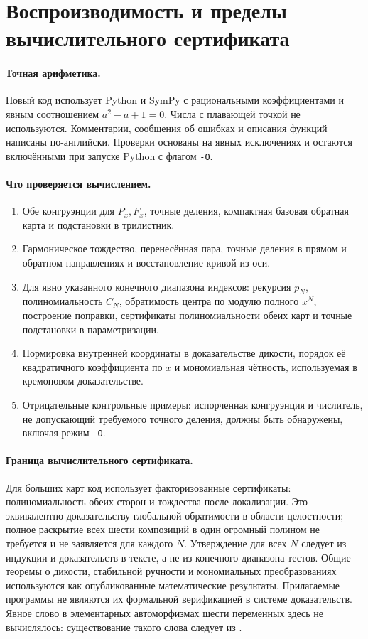 \section{Воспроизводимость и пределы вычислительного сертификата}
\label{sec:reproducibility}

\paragraph{Точная арифметика.}
Новый код использует Python и SymPy с рациональными коэффициентами
и явным соотношением $a^2-a+1=0$. Числа с плавающей точкой не
используются. Комментарии, сообщения об ошибках и описания функций
написаны по-английски. Проверки основаны на явных исключениях и
остаются включёнными при запуске Python с флагом \texttt{-O}.

\paragraph{Что проверяется вычислением.}
\begin{enumerate}
\item Обе конгруэнции для $P_x,F_x$, точные деления, компактная
базовая обратная карта и подстановки в трилистник.
\item Гармоническое тождество, перенесённая пара, точные деления
в прямом и обратном направлениях и восстановление кривой из оси.
\item Для явно указанного конечного диапазона индексов:
рекурсия $p_N$, полиномиальность $C_N$, обратимость центра по модулю
полного $x^N$, построение поправки, сертификаты полиномиальности
обеих карт и точные подстановки в параметризации.
\item Нормировка внутренней координаты в доказательстве дикости,
порядок её квадратичного коэффициента по $x$ и мономиальная чётность,
используемая в кремоновом доказательстве.
\item Отрицательные контрольные примеры: испорченная конгруэнция
и числитель, не допускающий требуемого точного деления, должны быть
обнаружены, включая режим \texttt{-O}.
\end{enumerate}

\paragraph{Граница вычислительного сертификата.}
Для больших карт код использует факторизованные сертификаты:
полиномиальность обеих сторон и тождества после локализации. Это
эквивалентно доказательству глобальной обратимости в области целостности;
полное раскрытие всех шести композиций в один огромный полином
не требуется и не заявляется для каждого $N$.
Утверждение для всех $N$ следует из индукции и доказательств в тексте,
а не из конечного диапазона тестов. Общие теоремы о дикости,
стабильной ручности и мономиальных преобразованиях используются
как опубликованные математические результаты. Прилагаемые программы
не являются их формальной верификацией в системе доказательств.
Явное слово в элементарных автоморфизмах шести переменных здесь
не вычислялось: существование такого слова следует из \cite{BEW2012}.

